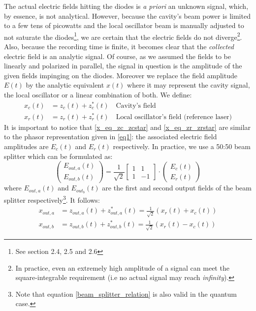 \documentclass[11pt]{report}
\begin{document}
The actual electric fields hitting the diodes is \textit{a priori} an unknown signal, which, by essence, is not analytical. However, because the cavity's beam power is limited to a few tens of picowatts and the local oscillator beam is manually adjusted to not saturate the diodes\footnote{See section 2.4, 2.5 and 2.6}, we are certain that the electric fields do not diverge\footnote{In practice, even an extremely high amplitude of a signal can meet the square-integrable requirement (i.e no actual signal may reach \textit{infinity}).}. Also, because the recording time is finite, it becomes clear that the \textit{collected} electric field is an analytic signal. Of course, as we assumed the fields to be linearly and polarized in parallel, the signal in question is the amplitude of the given fields impinging on the diodes. Moreover we replace the field amplitude $E(t)$ by the analytic equivalent $x(t)$ where it may represent the cavity signal, the local oscillator or a linear combination of both. We define:
\begin{align}
\label{x_eq_zc_zcstar}
x_c(t) &= z_c(t) + z_c^*(t) \quad \textrm{Cavity's field}\\
\label{x_eq_zr_zrstar}
x_r(t) &= z_r(t) + z_r^*(t) \quad \textrm{Local oscillator's field (reference laser)}
\end{align}
It is important to notice that \eqref{x_eq_zc_zcstar} and \eqref{x_eq_zr_zrstar} are similar to the phasor representation given in \eqref{eq1}: the associated electric field amplitudes are $E_c(t)$ and $E_r(t)$ respectively. In practice, we use a 50:50 beam splitter which can be formulated as:
\begin{equation}
\label{beam_splitter_relation}
\begin{pmatrix}
E_{out,a}(t)\\E_{out,b}(t)
\end{pmatrix}
=
\frac{1}{\sqrt{2}}\begin{bmatrix}
1 & 1\\
1 & -1
\end{bmatrix}
\cdot
\begin{pmatrix}
E_c(t)\\E_r(t)
\end{pmatrix}
\end{equation}
where $E_{out,a}(t)$ and $E_{out_b}(t)$ are the first and second output fields of the beam splitter respectively\footnote{Note that equation \eqref{beam_splitter_relation} is  also valid in the quantum case.}. It follows:
\begin{align}
\label{x_out_a_def}
x_{out,a} &= z_{out,a}(t) + z^*_{out,a}(t) = \frac{1}{\sqrt{2}}(x_r(t) + x_c(t))\\
\label{x_out_b_def}
x_{out,b} &= z_{out,b}(t) + z^*_{out,b}(t) = \frac{1}{\sqrt{2}}(x_r(t) - x_c(t))
\end{align}
\end{document}
